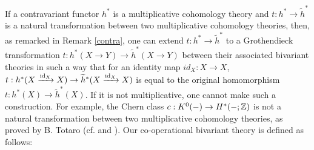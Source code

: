 \documentclass[a4paper]{amsart}
\begin{document}
If a contravariant functor $h^*$ is a multiplicative cohomology theory and $t: h^* \to \widetilde h^*$ is a natural transformation between two multiplicative cohomology theories, then, as remarked in Remark \ref{contra}, one can extend $t:h^* \to \widetilde h^*$ to a Grothendieck transformation $t:h^*(X \to Y) \to \widetilde h^*(X \to Y)$ between their associated bivariant theories in such a way that for an identity map $id_X:X \to X$, $t:h^*(X \xrightarrow {\operatorname{id}_X} X) \to \widetilde h^*(X \xrightarrow {\operatorname{id}_X} X)$ is equal to the original 
homomorphism $t:h^*(X) \to \widetilde h^*(X)$. If it is not multiplicative, one cannot make such a construction. For example, the Chern class $c: K^0(-) \to H^*(-;\mathbb Z)$ is not a natural transformation between two multiplicative cohomology theories, as proved by B. Totaro \cite{Totaro} (cf. \cite{Groth} and \cite{Segal}).
Our co-operational bivariant theory is defined as follows:
\end{document}
